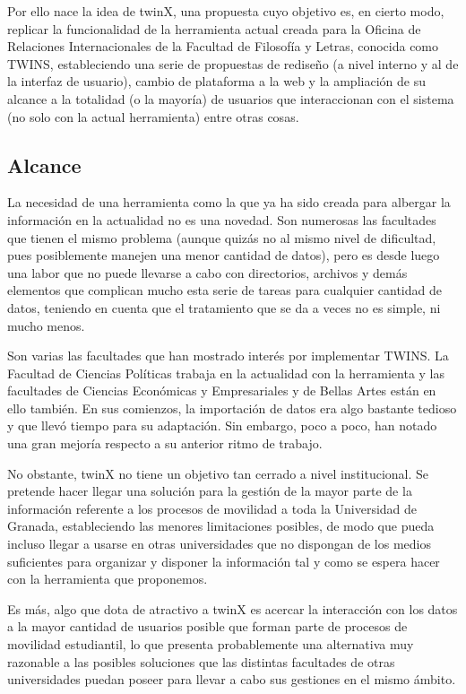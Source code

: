 \documentclass[12pt]{article}
\begin{document}
Por ello nace la idea de twinX, una propuesta cuyo objetivo es, en cierto modo, replicar la funcionalidad de la herramienta actual creada para la Oficina de Relaciones Internacionales de la Facultad de Filosofía y Letras, conocida como TWINS, estableciendo una serie de propuestas de rediseño (a nivel interno y al de la interfaz de usuario), cambio de plataforma a la web y la ampliación de su alcance a la totalidad (o la mayoría) de usuarios que interaccionan con el sistema (no solo con la actual herramienta) entre otras cosas.

\subsection{Alcance}

La necesidad de una herramienta como la que ya ha sido creada para albergar la información en la actualidad no es una novedad. Son numerosas las facultades que tienen el mismo problema (aunque quizás no al mismo nivel de dificultad, pues posiblemente manejen una menor cantidad de datos), pero es desde luego una labor que no puede llevarse a cabo con directorios, archivos y demás elementos que complican mucho esta serie de tareas para cualquier cantidad de datos, teniendo en cuenta que el tratamiento que se da a veces no es simple, ni mucho menos.

Son varias las facultades que han mostrado interés por implementar TWINS. La Facultad de Ciencias Políticas trabaja en la actualidad con la herramienta y las facultades de Ciencias Económicas y Empresariales y de Bellas Artes están en ello también. En sus comienzos, la importación de datos era algo bastante tedioso y que llevó tiempo para su adaptación. Sin embargo, poco a poco, han notado una gran mejoría respecto a su anterior ritmo de trabajo.

No obstante, twinX no tiene un objetivo tan cerrado a nivel institucional. Se pretende hacer llegar una solución para la gestión de la mayor parte de la información referente a los procesos de movilidad a toda la Universidad de Granada, estableciendo las menores limitaciones posibles, de modo que pueda incluso llegar a usarse en otras universidades que no dispongan de los medios suficientes para organizar y disponer la información tal y como se espera hacer con la herramienta que proponemos.

Es más, algo que dota de atractivo a twinX es acercar la interacción con los datos a la mayor cantidad de usuarios posible que forman parte de procesos de movilidad estudiantil, lo que presenta probablemente una alternativa muy razonable a las posibles soluciones que las distintas facultades de otras universidades puedan poseer para llevar a cabo sus gestiones en el mismo ámbito.
\end{document}
